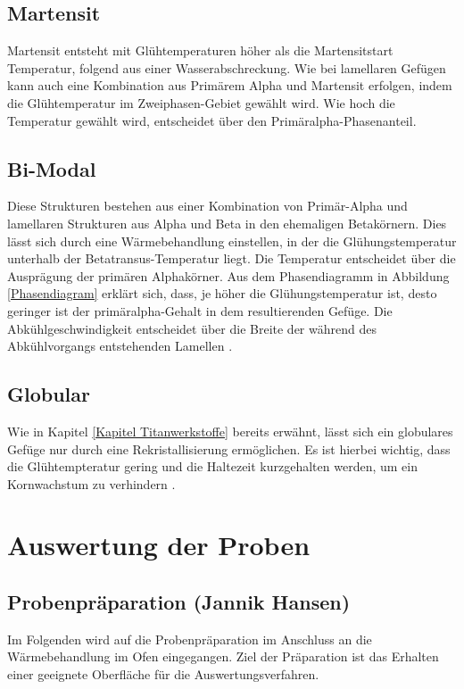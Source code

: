 \documentclass[a4paper, 11pt]{tubsreprt}
\begin{document}
\subsection{Martensit}
Martensit entsteht mit Glühtemperaturen höher als die Martensitstart  Temperatur, folgend aus einer Wasserabschreckung. Wie bei lamellaren Gefügen kann auch eine Kombination aus Primärem Alpha und Martensit erfolgen, indem die Glühtemperatur im Zweiphasen-Gebiet gewählt wird. Wie hoch die Temperatur gewählt wird, entscheidet über den Primäralpha-Phasenanteil.

\subsection{Bi-Modal}
Diese Strukturen bestehen aus einer Kombination von Primär-Alpha und lamellaren Strukturen aus Alpha und Beta in den ehemaligen Betakörnern. Dies lässt sich durch eine Wärmebehandlung einstellen, in der die Glühungstemperatur unterhalb der Betatransus-Temperatur liegt. Die Temperatur entscheidet über die Ausprägung der primären Alphakörner. Aus dem Phasendiagramm in Abbildung \ref{Phasendiagram} erklärt sich, dass, je höher die Glühungstemperatur ist, desto geringer ist der primäralpha-Gehalt in dem resultierenden Gefüge. Die Abkühlgeschwindigkeit entscheidet über die Breite der während des Abkühlvorgangs entstehenden Lamellen \cite{Luetjering2007}.

\subsection{Globular}
Wie in Kapitel \ref{Kapitel Titanwerkstoffe} bereits erwähnt, lässt sich ein globulares Gefüge nur durch eine Rekristallisierung ermöglichen. Es ist hierbei wichtig, dass die Glühtempteratur gering und die Haltezeit kurzgehalten werden, um ein Kornwachstum zu verhindern \cite{Luetjering2007}.

\newpage

\section{Auswertung der Proben}
\subsection{Probenpräparation (Jannik Hansen)}\label{Kapitel Probenpräperation}
Im Folgenden wird auf die Probenpräparation im Anschluss an die Wärmebehandlung im Ofen eingegangen. Ziel der Präparation ist das Erhalten einer geeignete Oberfläche für die Auswertungsverfahren. 
\end{document}
